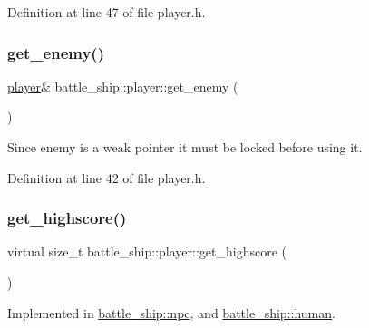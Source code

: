 Definition at line 47 of file player.\+h.

\mbox{\label{classbattle__ship_1_1player_a5224958feae654d622f56523dc45ab83}} 
\subsubsection{\texorpdfstring{get\+\_\+enemy()}{get\_enemy()}}
{\footnotesize\ttfamily \hyperlink{classbattle__ship_1_1player}{player}\& battle\+\_\+ship\+::player\+::get\+\_\+enemy (\begin{DoxyParamCaption}{ }\end{DoxyParamCaption})\hspace{0.3cm}{\ttfamily [inline]}}



Since enemy is a weak pointer it must be locked before using it. 



Definition at line 42 of file player.\+h.

\mbox{\label{classbattle__ship_1_1player_a9b74e59f4b120d38ad591dba6a1d1ba7}} 
\subsubsection{\texorpdfstring{get\+\_\+highscore()}{get\_highscore()}}
{\footnotesize\ttfamily virtual size\+\_\+t battle\+\_\+ship\+::player\+::get\+\_\+highscore (\begin{DoxyParamCaption}{ }\end{DoxyParamCaption})\hspace{0.3cm}{\ttfamily [pure virtual]}}



Implemented in \hyperlink{classbattle__ship_1_1npc_acb3ad1c27c948ae968697c795f10a6b9}{battle\+\_\+ship\+::npc}, and \hyperlink{classbattle__ship_1_1human_ac3529c252376938ce6b62ac40f8df3b3}{battle\+\_\+ship\+::human}.

\mbox{\label{classbattle__ship_1_1player_a4a5406b436812664cb706c31b745239b}} 
